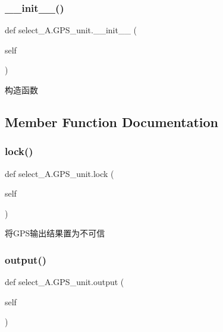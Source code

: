 \subsubsection{\texorpdfstring{\+\_\+\+\_\+init\+\_\+\+\_\+()}{\_\_init\_\_()}}
{\footnotesize\ttfamily def select\+\_\+\+A.\+G\+P\+S\+\_\+unit.\+\_\+\+\_\+init\+\_\+\+\_\+ (\begin{DoxyParamCaption}\item[{}]{self }\end{DoxyParamCaption})}



构造函数 



\subsection{Member Function Documentation}
\mbox{\label{classselect___a_1_1_g_p_s__unit_a479fed8895f826db72f0a465a5915e08}} 
\subsubsection{\texorpdfstring{lock()}{lock()}}
{\footnotesize\ttfamily def select\+\_\+\+A.\+G\+P\+S\+\_\+unit.\+lock (\begin{DoxyParamCaption}\item[{}]{self }\end{DoxyParamCaption})}



将\+G\+P\+S输出结果置为不可信 

\mbox{\label{classselect___a_1_1_g_p_s__unit_a687b0211ca2109c490abdb0ead0a0f49}} 
\subsubsection{\texorpdfstring{output()}{output()}}
{\footnotesize\ttfamily def select\+\_\+\+A.\+G\+P\+S\+\_\+unit.\+output (\begin{DoxyParamCaption}\item[{}]{self }\end{DoxyParamCaption})}



